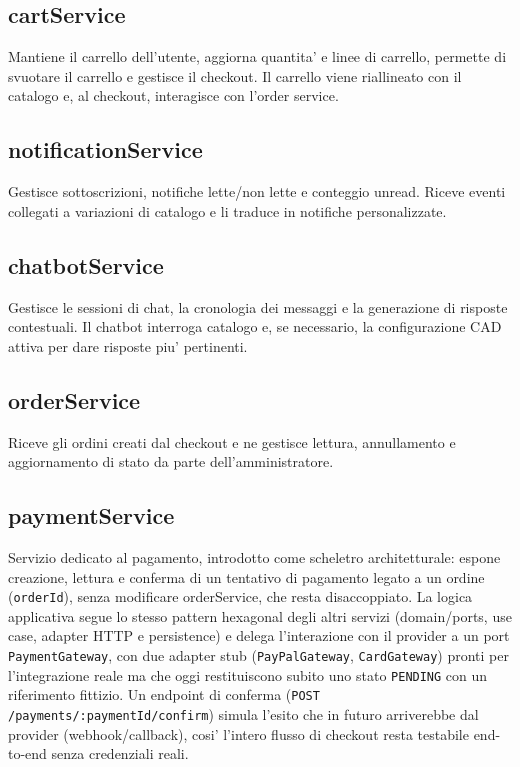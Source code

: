 \subsection{cartService}
Mantiene il carrello dell'utente, aggiorna quantita' e linee di carrello, permette di svuotare il carrello e gestisce il checkout. Il carrello viene riallineato con il catalogo e, al checkout, interagisce con l'order service.

\subsection{notificationService}
Gestisce sottoscrizioni, notifiche lette/non lette e conteggio unread. Riceve eventi collegati a variazioni di catalogo e li traduce in notifiche personalizzate.

\subsection{chatbotService}
Gestisce le sessioni di chat, la cronologia dei messaggi e la generazione di risposte contestuali. Il chatbot interroga catalogo e, se necessario, la configurazione CAD attiva per dare risposte piu' pertinenti.

\subsection{orderService}
Riceve gli ordini creati dal checkout e ne gestisce lettura, annullamento e aggiornamento di stato da parte dell'amministratore.

\subsection{paymentService}
Servizio dedicato al pagamento, introdotto come scheletro architetturale: espone creazione, lettura e conferma di un tentativo di pagamento legato a un ordine (\texttt{orderId}), senza modificare orderService, che resta disaccoppiato. La logica applicativa segue lo stesso pattern hexagonal degli altri servizi (domain/ports, use case, adapter HTTP e persistence) e delega l'interazione con il provider a un port \texttt{PaymentGateway}, con due adapter stub (\texttt{PayPalGateway}, \texttt{CardGateway}) pronti per l'integrazione reale ma che oggi restituiscono subito uno stato \texttt{PENDING} con un riferimento fittizio. Un endpoint di conferma (\texttt{POST /payments/:paymentId/confirm}) simula l'esito che in futuro arriverebbe dal provider (webhook/callback), cosi' l'intero flusso di checkout resta testabile end-to-end senza credenziali reali.

